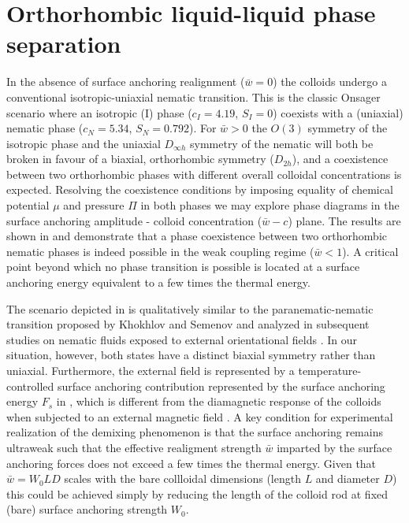    \section{Orthorhombic liquid-liquid phase separation}

In the absence of surface anchoring realignment ($\bar{w} = 0$) the colloids undergo a conventional isotropic-uniaxial nematic transition. This is the classic Onsager scenario where an isotropic (I) phase  ($c_{I} = 4.19$, $S_{I} =0$) coexists with a (uniaxial) nematic phase  ($c_{N} = 5.34$, $S_{N} =0.792$). For $\bar{w} >0$ the $O(3)$ symmetry of the isotropic phase and the uniaxial $D_{\infty h}$ symmetry of the nematic will both be broken in favour of a biaxial, orthorhombic symmetry ($D_{2h}$), and a coexistence between two orthorhombic phases with different overall colloidal concentrations is expected. Resolving the coexistence conditions by imposing equality of chemical potential $\mu$ and pressure $\Pi$ in both phases we may explore phase diagrams in the surface anchoring amplitude - colloid concentration ($\bar{w} - c$) plane. The results are shown in  and demonstrate that a phase coexistence between two orthorhombic nematic phases is indeed possible in the weak coupling regime ($\bar{w} <1$). A critical point beyond which no phase transition is possible is located at a surface anchoring energy equivalent to a few times the thermal energy.

The scenario depicted in   is qualitatively similar to the paranematic-nematic transition proposed by Khokhlov and Semenov \cite{khokhlov1982influence} and analyzed in subsequent  studies on nematic fluids exposed to external orientational fields \cite{szalai1998external,varga2000external,wensink2005nematic,van2008influence}. In our situation, however,  both states  have a distinct biaxial symmetry rather than uniaxial. Furthermore, the external field is represented by a temperature-controlled surface anchoring contribution represented by the surface anchoring energy $F_{s}$  in , which is different from the diamagnetic response of the colloids when subjected to an external magnetic field \cite{wensink2005nematic,van2008influence}. A key condition for experimental realization of the demixing phenomenon is that the surface anchoring remains ultraweak such that the effective realigment strength $\bar{w}$ imparted by the surface anchoring forces  does not exceed a few times the thermal energy.  Given that   $\bar{w} = W_{0} LD $ scales with the bare collloidal dimensions (length $L$ and diameter $D$) this could be achieved simply by reducing the length of the colloid rod at fixed (bare) surface anchoring strength $W_{0}$.  


